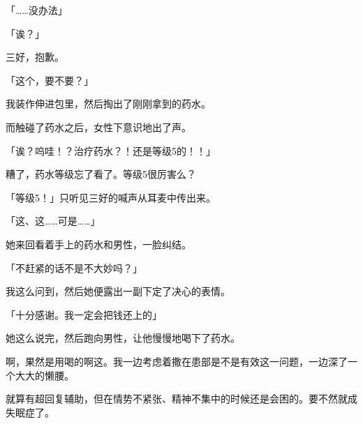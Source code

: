 「……没办法」

「诶？」

三好，抱歉。

「这个，要不要？」

我装作伸进包里，然后掏出了刚刚拿到的药水。

而触碰了药水之后，女性下意识地出了声。

「诶？呜哇！？治疗药水？！还是等级5的！！」

糟了，药水等级忘了看了。等级5很厉害么？

「等级5！」只听见三好的喊声从耳麦中传出来。

「这、这……可是……」

她来回看着手上的药水和男性，一脸纠结。

「不赶紧的话不是不大妙吗？」

我这么问到，然后她便露出一副下定了决心的表情。

「十分感谢。我一定会把钱还上的」

她这么说完，然后跑向男性，让他慢慢地喝下了药水。

啊，果然是用喝的啊这。我一边考虑着撒在患部是不是有效这一问题，一边深了一个大大的懒腰。

就算有超回复辅助，但在情势不紧张、精神不集中的时候还是会困的。要不然就成失眠症了。

